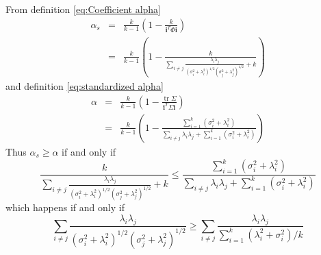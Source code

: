\documentclass{article}
\makeatletter
\theoremstyle{plain}
\theoremstyle{plain}
\theoremstyle{definition}
\theoremstyle{remark}
\theoremstyle{definition}
\theoremstyle{plain}
\theoremstyle{plain}
\theoremstyle{definition}
\newenvironment{proof}[1][\protect\proofname]{\par
	\normalfont\topsep6\p@\@plus6\p@\relax
	\trivlist
	\itemindent\parindent
	\item[\hskip\labelsep\scshape #1]\ignorespaces
}{%
	\endtrivlist\@endpefalse
}
\providecommand{\proofname}{Proof}
\DeclareMathOperator{\tr}{tr}
\renewcommand{\sqrt}[1]{{(#1)^{1/2}}}
\makeatother
\begin{document}
\begin{proof}
From definition \eqref{eq:Coefficient alpha}
\begin{eqnarray*}
\alpha_{s} & = & \frac{k}{k-1}\left(1-\frac{k}{\mathbf{i}^{T}\Phi\mathbf{i}}\right)\\
 & = & \frac{k}{k-1}\left(1-\frac{k}{\sum_{i\neq j}\frac{\lambda_{i}\lambda_{j}}{\sqrt{\sigma_{i}^{2}+\lambda_{i}^{2}}\sqrt{\sigma_{j}^{2}+\lambda_{j}^{2}}}+k}\right)
\end{eqnarray*}
and definition \eqref{eq:standardized alpha}
\begin{eqnarray*}
\alpha & = & \frac{k}{k-1}\left(1-\frac{\tr\Sigma}{\mathbf{i}^{T}\Sigma\mathbf{i}}\right)\\
 & = & \frac{k}{k-1}\left(1-\frac{\sum_{i=1}^{k}\left(\sigma_{i}^{2}+\lambda_{i}^{2}\right)}{\sum_{i\neq j}\lambda_{i}\lambda_{j}+\sum_{i=1}^{k}\left(\sigma_{i}^{2}+\lambda_{i}^{2}\right)}\right)
\end{eqnarray*}
Thus $\alpha_{s}\geq\alpha$ if and only if
\[
\frac{k}{\sum_{i\neq j}\frac{\lambda_{i}\lambda_{j}}{\sqrt{\sigma_{i}^{2}+\lambda_{i}^{2}}\sqrt{\sigma_{j}^{2}+\lambda_{j}^{2}}}+k}\leq\frac{\sum_{i=1}^{k}\left(\sigma_{i}^{2}+\lambda_{i}^{2}\right)}{\sum_{i\neq j}\lambda_{i}\lambda_{j}+\sum_{i=1}^{k}\left(\sigma_{i}^{2}+\lambda_{i}^{2}\right)}
\]
which happens if and only if 
\[
\sum_{i\neq j}\frac{\lambda_{i}\lambda_{j}}{\sqrt{\sigma_{i}^{2}+\lambda_{i}^{2}}\sqrt{\sigma_j^{2}+\lambda_{j}^{2}}}\geq\sum_{i\neq j}\frac{\lambda_{i}\lambda_{j}}{\sum_{i=1}^{k}\left(\lambda_{i}^{2}+\sigma_{i}^{2}\right)/k}
\]
\end{proof}
\end{document}
